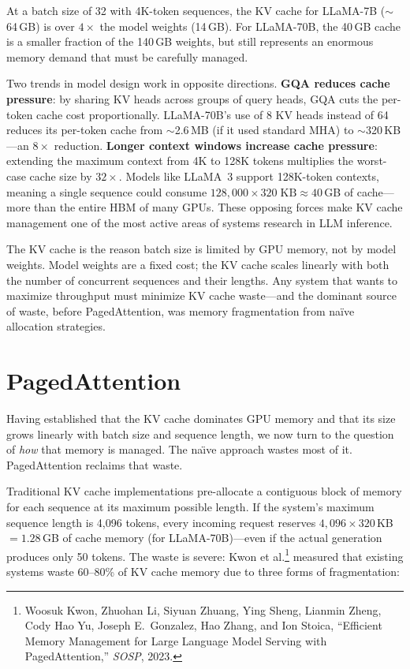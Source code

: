 At a batch size of 32 with 4K-token sequences, the KV cache for LLaMA-7B ($\sim$64\,GB) is over $4\times$ the model weights (14\,GB). For LLaMA-70B, the 40\,GB cache is a smaller fraction of the 140\,GB weights, but still represents an enormous memory demand that must be carefully managed.

Two trends in model design work in opposite directions. \textbf{GQA reduces cache pressure}: by sharing KV heads across groups of query heads, GQA cuts the per-token cache cost proportionally. LLaMA-70B's use of 8 KV heads instead of 64 reduces its per-token cache from $\sim$2.6\,MB (if it used standard MHA) to $\sim$320\,KB---an $8\times$ reduction. \textbf{Longer context windows increase cache pressure}: extending the maximum context from 4K to 128K tokens multiplies the worst-case cache size by $32\times$. Models like LLaMA~3 support 128K-token contexts, meaning a single sequence could consume $128{,}000 \times 320\;\text{KB} \approx 40$\,GB of cache---more than the entire HBM of many GPUs. These opposing forces make KV cache management one of the most active areas of systems research in LLM inference.

\begin{insightbox}
The KV cache is the reason batch size is limited by GPU memory, not by model weights. Model weights are a fixed cost; the KV cache scales linearly with both the number of concurrent sequences and their lengths. Any system that wants to maximize throughput must minimize KV cache waste---and the dominant source of waste, before PagedAttention, was memory fragmentation from na\"ive allocation strategies.
\end{insightbox}

\section{PagedAttention}
\label{sec:kvcache:paged}

%
Having established that the KV cache dominates GPU memory and that its size grows linearly with batch size and sequence length, we now turn to the question of \emph{how} that memory is managed. The na\"{\i}ve approach wastes most of it. PagedAttention reclaims that waste.

Traditional KV cache implementations pre-allocate a contiguous block of memory for each sequence at its maximum possible length. If the system's maximum sequence length is 4,096 tokens, every incoming request reserves $4{,}096 \times 320$\,KB $= 1.28$\,GB of cache memory (for LLaMA-70B)---even if the actual generation produces only 50 tokens. The waste is severe: Kwon et al.\footnote{Woosuk Kwon, Zhuohan Li, Siyuan Zhuang, Ying Sheng, Lianmin Zheng, Cody Hao Yu, Joseph E.\ Gonzalez, Hao Zhang, and Ion Stoica, ``Efficient Memory Management for Large Language Model Serving with PagedAttention,'' \emph{SOSP}, 2023.} measured that existing systems waste 60--80\% of KV cache memory due to three forms of fragmentation:

